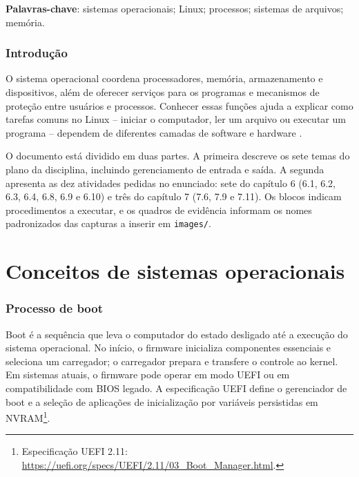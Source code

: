 \documentclass[12pt,a4paper,oneside]{article}
\begin{document}
\noindent\textbf{Palavras-chave}: sistemas operacionais; Linux; processos; sistemas de arquivos; memória.
\clearpage
\tableofcontents\clearpage
\listoffigures\clearpage
\listoftables\clearpage
{}

\section{Introdução}
O sistema operacional coordena processadores, memória, armazenamento e dispositivos, além de oferecer serviços para os programas e mecanismos de proteção entre usuários e processos. Conhecer essas funções ajuda a explicar como tarefas comuns no Linux -- iniciar o computador, ler um arquivo ou executar um programa -- dependem de diferentes camadas de software e hardware \cite{silberschatz,tanenbaum,arpaci}.

O documento está dividido em duas partes. A primeira descreve os sete temas do plano da disciplina, incluindo gerenciamento de entrada e saída. A segunda apresenta as dez atividades pedidas no enunciado: sete do capítulo 6 (6.1, 6.2, 6.3, 6.4, 6.8, 6.9 e 6.10) e três do capítulo 7 (7.6, 7.9 e 7.11). Os blocos indicam procedimentos a executar, e os quadros de evidência informam os nomes padronizados das capturas a inserir em \texttt{images/}.

\part{Conceitos de sistemas operacionais}
\section{Processo de boot}
Boot é a sequência que leva o computador do estado desligado até a execução do sistema operacional. No início, o firmware inicializa componentes essenciais e seleciona um carregador; o carregador prepara e transfere o controle ao kernel. Em sistemas atuais, o firmware pode operar em modo UEFI ou em compatibilidade com BIOS legado. A especificação UEFI define o gerenciador de boot e a seleção de aplicações de inicialização por variáveis persistidas em NVRAM\footnote{Especificação UEFI 2.11: \url{https://uefi.org/specs/UEFI/2.11/03_Boot_Manager.html}.}.
\end{document}
